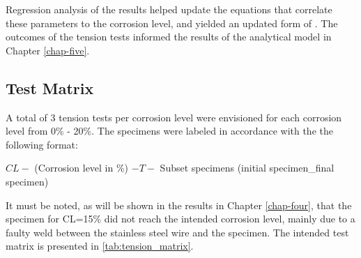 Regression analysis of the results helped update the equations that correlate these parameters to the corrosion level, and yielded an updated form of . The outcomes of the tension tests informed the results of the analytical model in Chapter \ref{chap-five}.

\subsection{Test Matrix}

A total of 3 tension tests per corrosion level were envisioned for each corrosion level from 0\% - 20\%. The specimens were labeled in accordance with the the following format:

$CL-$ (Corrosion level in  \%) $-T-$ Subset specimens (initial specimen\_final specimen)

It must be noted, as will be shown in the results in Chapter \ref{chap-four}, that the specimen for CL=15\% did not reach the intended corrosion level, mainly due to a faulty weld between the stainless steel wire and the specimen. The intended test matrix is presented in \ref{tab:tension_matrix}.

